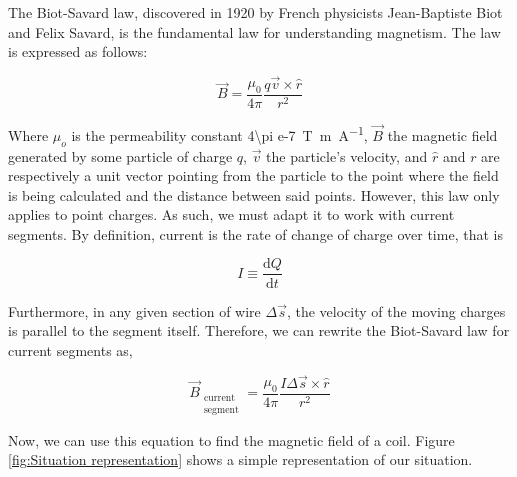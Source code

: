 The Biot-Savard law, discovered in 1920 by French physicists Jean-Baptiste Biot and Felix Savard, is the fundamental law for understanding magnetism. The law is expressed as follows:

\begin{equation}
    \vec{B}=\frac{\mu_0}{4\pi}\frac{q\vec{v}\times\hat{r}}{r^2}
    \label{eq: Biot-Savard law}
\end{equation}

Where $\mu_o$ is the permeability constant \SI{4\pi e-7}{\tesla\metre\per\ampere}, $\vec{B}$ the magnetic field generated by some particle of charge $q$, $\vec{v}$ the particle's velocity, and $\hat{r}$ and $r$ are respectively a unit vector pointing from the particle to the point where the field is being calculated and the distance between said points. However, this law only applies to point charges. As such, we must adapt it to work with current segments. By definition, current is the rate of change of charge over time, that is 

\begin{equation}
    I\equiv\frac{\text{d} Q}{\text{d}t}
    \label{eq: Current definition}
\end{equation}

Furthermore, in any given section of wire $\Delta\vec{s}$, the velocity of the moving charges is parallel to the segment itself. Therefore, we can rewrite the Biot-Savard law for current segments as,

\begin{equation}
    \vec{B}_{\substack{\text{current}\\ \text{segment}}}=\frac{\mu_0}{4\pi}\frac{I\Delta\vec{s}\times\hat{r}}{r^2}
    \label{eq: Current Biot-Savard}
\end{equation}

Now, we can use this equation to find the magnetic field of a coil. Figure \ref{fig:Situation representation} shows a simple representation of our situation. 

